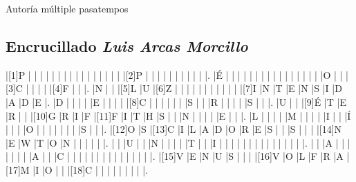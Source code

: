 \Titular*%
{Pasatempos}%
{ Autoría múltiple}%
{pasatempos}%
{}%

\begin{refsection}
\vspace*{-6mm}
\section*{\textcolor{Resalte}{Encrucillado } {\normalfont \itshape Luis Arcas Morcillo}}%

\begin{Puzzle}{27}{16}
|[1]P  |{}    |{}    |{}    |{}    |{}    |{}    |{}    |{}    |{}    |{}    |{}    |{}    |{}    |{}    |{}    |{}    |[2]P  |{}    |{}    |{}    |{}    |{}    |{}    |{}    |{}    |{}   |{} |.
|É     |{}    |{}    |{}    |{}    |{}    |{}    |{}    |{}    |{}    |{}    |{}    |{}    |{}    |{}    |{}    |{}    |O     |{}    |{}    |[3]C  |{}    |{}    |{}    |{}    |[4]F  |{}   |{} |.
|N     |{}    |{}    |[5]L  |U     |[6]Z  |{}    |{}    |{}    |{}    |{}    |{}    |{}    |{}    |{}    |{}    |{}    |[7]I  |N     |T     |E     |N     |S     |I     |D     |A     |D    |E  |.
|D     |{}    |{}    |{}    |{}    |E     |{}    |{}    |{}    |{}    |[8]C  |{}    |{}    |{}    |{}    |{}    |{}    |S     |{}    |{}    |R     |{}    |{}    |{}    |{}    |S     |{}   |{} |.
|U     |{}    |{}    |[9]É  |T     |E     |R     |{}    |{}    |[10]G |R     |I     |F     |[11]F |I     |T     |H     |S     |{}    |{}    |N     |{}    |{}    |{}    |{}    |E     |{}   |{} |.
|L     |{}    |{}    |{}    |{}    |M     |{}    |{}    |{}    |{}    |I     |{}    |{}    |Í     |{}    |{}    |{}    |O     |{}    |{}    |{}    |{}    |{}    |{}    |{}    |S     |{}   |{} |.
|[12]O |S     |[13]C |I     |L     |A     |D     |O     |R     |E     |S     |{}    |{}    |S     |{}    |{}    |{}    |[14]N |E     |W     |T     |O     |N     |{}    |{}    |{}    |{}   |{} |.
|{}    |{}    |U     |{}    |{}    |N     |{}    |{}    |{}    |{}    |T     |{}    |{}    |I     |{}    |{}    |{}    |{}    |{}    |{}    |{}    |{}    |{}    |{}    |{}    |{}    |{}   |{} |.
|{}    |{}    |A     |{}    |{}    |{}    |{}    |{}    |{}    |{}    |A     |{}    |{}    |C     |{}    |{}    |{}    |{}    |{}    |{}    |{}    |{}    |{}    |{}    |{}    |{}    |{}   |{} |.
|[15]V |E     |N     |U     |S     |{}    |{}    |{}    |[16]V |O     |L     |F     |R     |A     |[17]M |I     |O     |{}    |{}    |[18]C |{}    |{}    |{}    |{}    |{}    |{}    |{}   |{} |.

\end{Puzzle}
\end{refsection}
